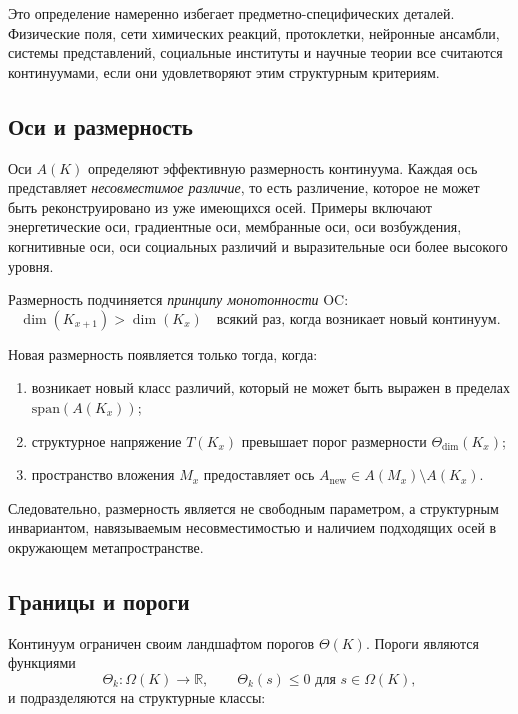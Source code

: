 Это определение намеренно избегает предметно-специфических деталей.
Физические поля, сети химических реакций, протоклетки, нейронные ансамбли, системы представлений, социальные институты и научные теории все считаются континуумами, если они удовлетворяют этим структурным критериям.

\subsection{Оси и размерность}

Оси \(A(K)\) определяют эффективную размерность континуума.
Каждая ось представляет \emph{несовместимое различие}, то есть различение, которое не может быть реконструировано из уже имеющихся осей.
Примеры включают энергетические оси, градиентные оси, мембранные оси, оси возбуждения, когнитивные оси, оси социальных различий и выразительные оси более высокого уровня.

Размерность подчиняется \emph{принципу монотонности} OC:
\[
\dim(K_{x+1}) > \dim(K_x)
\quad\text{всякий раз, когда возникает новый континуум}.
\]

Новая размерность появляется только тогда, когда:

\begin{enumerate}
    \item возникает новый класс различий, который не может быть выражен в пределах \(\mathrm{span}(A(K_x))\);
    \item структурное напряжение \(T(K_x)\) превышает порог размерности \(\Theta_{\mathrm{dim}}(K_x)\);
    \item пространство вложения \(M_x\) предоставляет ось \(A_{\mathrm{new}}\in A(M_x)\setminus A(K_x)\).
\end{enumerate}

Следовательно, размерность является не свободным параметром, а структурным инвариантом, навязываемым несовместимостью и наличием подходящих осей в окружающем метапространстве.

\subsection{Границы и пороги}

Континуум ограничен своим ландшафтом порогов \(\Theta(K)\).
Пороги являются функциями
\[
\Theta_k : \Omega(K) \to \mathbb{R},
\qquad
\Theta_k(s)\le 0 \text{ для } s\in\Omega(K),
\]
и подразделяются на структурные классы:

